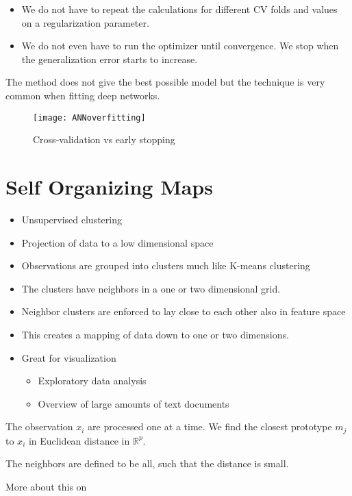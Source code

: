 \begin{itemize}
  \item We do not have to repeat the calculations for different CV folds and values on a regularization parameter.
  \item We do not even have to run the optimizer until convergence. We stop when the generalization error starts to increase.
\end{itemize}

The method does not give the best possible model but the technique
is very common when fitting deep networks. \cite[p.~24-25]{lecture10}

\begin{figure}[H]
  \centering
  \texttt{[image: ANNoverfitting]}
  \caption{Cross-validation vs early stopping}\label{fig:ANNoverfitting}
\end{figure}


\section{Self Organizing Maps}

\begin{itemize}
  \item Unsupervised clustering
  \item Projection of data to a low dimensional space
  \item Observations are grouped into clusters much like K-means clustering
  \item The clusters have neighbors in a one or two dimensional grid.
  \item Neighbor clusters are enforced to lay close to each other also in feature space
  \item This creates a mapping of data down to one or two dimensions.
  \item Great for visualization
  \begin{itemize}
    \item Exploratory data analysis
    \item Overview of large amounts of text documents
  \end{itemize}
\end{itemize}

The observation $x_i$ are processed one at a time. We find the closest prototype $m_j$ to $x_i$ in Euclidean distance in $\mathbb{R}^p$.

The neighbors are defined to be all, such that the distance is small.


More about this on \cite[p.~528]{friedman2016elements}
